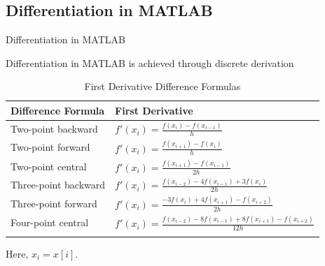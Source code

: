 \documentclass[aspectratio=169,xcolor=dvipsnames,svgnames,x11names,fleqn]{beamer}
\begin{document}
\subsection{Differentiation in MATLAB}

\begin{frame}
    \subsectionpage
\end{frame}

\begin{frame}{Differentiation in MATLAB}



Differentiation in MATLAB is achieved through discrete derivation

\footnotesize

\begin{table}[h]
\centering
\caption{First Derivative Difference Formulas}
\begin{tabular}{ll}
\hline
\textbf{Difference Formula} & \textbf{First Derivative} \\
\hline
Two-point backward & $f'(x_i) = \frac{f(x_i) - f(x_{i-1})}{h}$ \\
Two-point forward & $f'(x_i) = \frac{f(x_{i+1}) - f(x_i)}{h}$ \\
Two-point central & $f'(x_i) = \frac{f(x_{i+1}) - f(x_{i-1})}{2h}$ \\
Three-point backward & $f'(x_i) = \frac{f(x_{i-2}) - 4f(x_{i-1}) + 3f(x_i)}{2h}$ \\
Three-point forward & $f'(x_i) = \frac{-3f(x_i) + 4f(x_{i+1}) - f(x_{i+2})}{2h}$ \\
Four-point central & $f'(x_i) = \frac{f(x_{i-2}) - 8f(x_{i-1}) + 8f(x_{i+1}) - f(x_{i+2})}{12h}$ \\ \\
\hline
\end{tabular}
\end{table}

Here, $x_i = x[i]$.

\end{frame}
\end{document}
